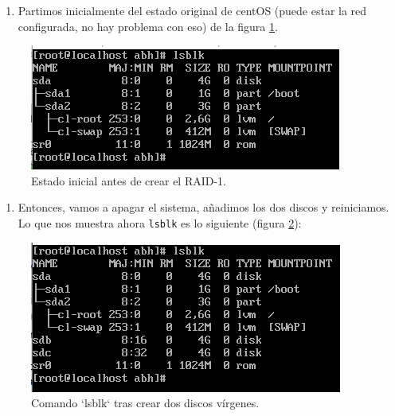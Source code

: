 \documentclass[
]{memoir}
\providecommand{\tightlist}{%
  \setlength{\itemsep}{0pt}\setlength{\parskip}{0pt}}
\begin{document}
\begin{enumerate}
\def\labelenumi{\arabic{enumi}.}
\tightlist
\item
  Partimos inicialmente del estado original de centOS (puede estar la red configurada, no hay problema con eso) de la figura \ref{fig:1h}.
\end{enumerate}

\begin{figure}

{\centering \includegraphics[width=0.75\linewidth]{images/1} 

}

\caption{Estado inicial antes de crear el RAID-1.}\label{fig:1h}
\end{figure}

\begin{enumerate}
\def\labelenumi{\arabic{enumi}.}
\setcounter{enumi}{1}
\tightlist
\item
  Entonces, vamos a apagar el sistema, añadimos los dos discos y reiniciamos. Lo que nos muestra ahora \texttt{lsblk} es lo siguiente (figura \ref{fig:2h}):
\end{enumerate}

\begin{figure}

{\centering \includegraphics[width=0.75\linewidth]{images/2} 

}

\caption{Comando `lsblk` tras crear dos discos vírgenes.}\label{fig:2h}
\end{figure}
\end{document}
